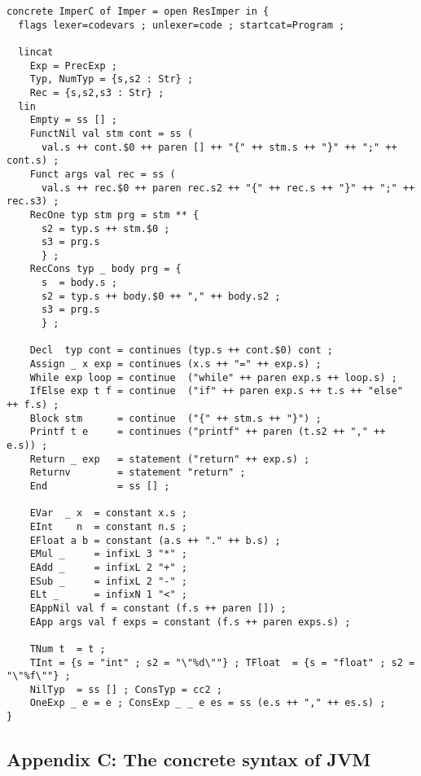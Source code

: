 \documentclass[12pt]{article}
\begin{document}
\small
\begin{verbatim}
concrete ImperC of Imper = open ResImper in {
  flags lexer=codevars ; unlexer=code ; startcat=Program ;

  lincat
    Exp = PrecExp ;
    Typ, NumTyp = {s,s2 : Str} ;
    Rec = {s,s2,s3 : Str} ;
  lin
    Empty = ss [] ;
    FunctNil val stm cont = ss (
      val.s ++ cont.$0 ++ paren [] ++ "{" ++ stm.s ++ "}" ++ ";" ++ cont.s) ;
    Funct args val rec = ss (
      val.s ++ rec.$0 ++ paren rec.s2 ++ "{" ++ rec.s ++ "}" ++ ";" ++ rec.s3) ;
    RecOne typ stm prg = stm ** {
      s2 = typ.s ++ stm.$0 ;
      s3 = prg.s
      } ;
    RecCons typ _ body prg = {
      s  = body.s ; 
      s2 = typ.s ++ body.$0 ++ "," ++ body.s2 ;
      s3 = prg.s
      } ;

    Decl  typ cont = continues (typ.s ++ cont.$0) cont ;
    Assign _ x exp = continues (x.s ++ "=" ++ exp.s) ;
    While exp loop = continue  ("while" ++ paren exp.s ++ loop.s) ;
    IfElse exp t f = continue  ("if" ++ paren exp.s ++ t.s ++ "else" ++ f.s) ;
    Block stm      = continue  ("{" ++ stm.s ++ "}") ;
    Printf t e     = continues ("printf" ++ paren (t.s2 ++ "," ++ e.s)) ;
    Return _ exp   = statement ("return" ++ exp.s) ;
    Returnv        = statement "return" ;
    End            = ss [] ;
 
    EVar  _ x  = constant x.s ;
    EInt    n  = constant n.s ;
    EFloat a b = constant (a.s ++ "." ++ b.s) ;
    EMul _     = infixL 3 "*" ;
    EAdd _     = infixL 2 "+" ;
    ESub _     = infixL 2 "-" ;
    ELt _      = infixN 1 "<" ;
    EAppNil val f = constant (f.s ++ paren []) ;
    EApp args val f exps = constant (f.s ++ paren exps.s) ;

    TNum t  = t ;     
    TInt = {s = "int" ; s2 = "\"%d\""} ; TFloat  = {s = "float" ; s2 = "\"%f\""} ;
    NilTyp  = ss [] ; ConsTyp = cc2 ;
    OneExp _ e = e ; ConsExp _ _ e es = ss (e.s ++ "," ++ es.s) ;
}
\end{verbatim}
\normalsize
\newpage


\subsection*{Appendix C: The concrete syntax of JVM}
\end{document}

